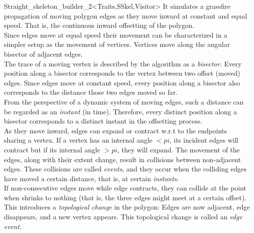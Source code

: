 \begin{ccRefClass}{Straight_skeleton_builder_2<Traits,SSkel,Visitor>}
It simulates  a grassfire propagation of moving polygon edges as they move inward at constant
and equal speed. That is, the continuous inward offsetting of the polygon.\\
Since edges move at equal speed their movement can be characterized in a simpler setup as the movement of vertices. Vertices move along the angular bisector of adjacent edges.\\
The trace of a moving vertex is described by the algorithm as a {\em bisector}. 
Every position along a bisector corresponds to the vertex between two offset (moved) edges. Since edges move at constant speed, every position along a bisector also corresponds to the distance those two edges moved so far.\\
From the perspective of a dynamic system of moving edges, such a distance can be regarded as an 
{\em instant} (in time). Therefore, every distinct position along a bisector corresponds to a distinct instant in the offsetting process.\\
As they move inward, edges can expand or contract w.r.t to the endpoints sharing a vertex. If a vertex has an internal angle $<pi$, its incident edges will contract but if its internal angle $>pi$, they will expand. The movement of the edges, along with their extent change, result in collisions between non-adjacent edges. These collisions are called {\em events}, and they occur when the colliding edges have moved a certain distance, that is, at certain \textit{instants}.\\
If non-consecutive edges  move while edge  contracts, they can collide at the point when  shrinks to nothing (that is, the three edges might meet at a certain offset). This introduces a \textit{topological change} in the polygon: Edges  are now adjacent, edge  disappears, and a new vertex appears. This topological change is called an {\em edge event}.\\

\end{ccRefClass}
